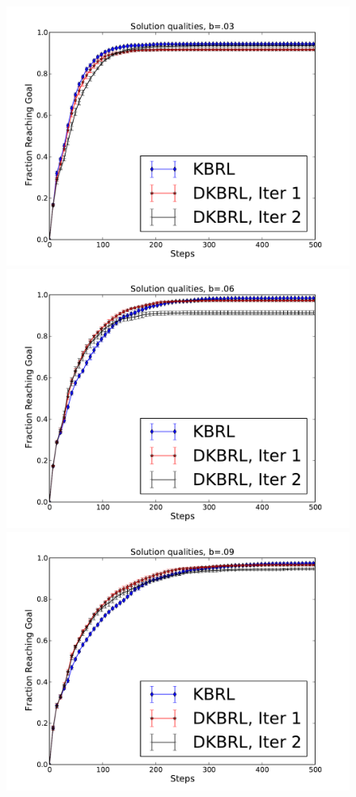 \documentclass{article} %
\begin{document}
\begin{figure}[!htb]
  \centering
    \includegraphics[width=\linewidth]{./figs/acb03.pdf}
  \endminipage\hfill
    \includegraphics[width=\linewidth]{./figs/acb06.pdf}
  \endminipage\hfill
    \includegraphics[width=\linewidth]{./figs/acb09.pdf}

\end{figure}
\end{document}

